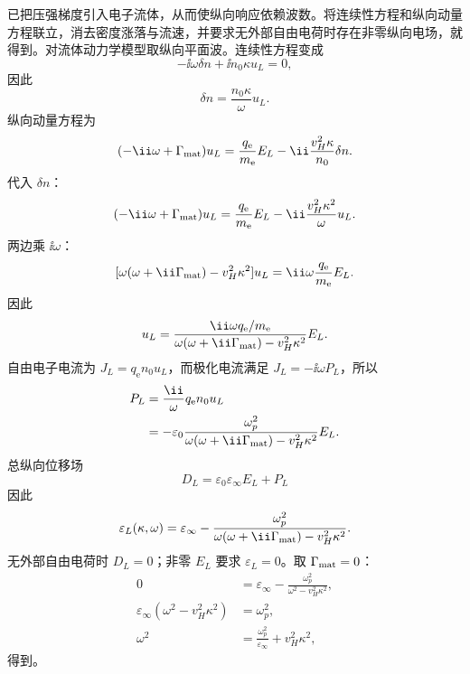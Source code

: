 \begin{exbox}
\medskip

 已把压强梯度引入电子流体，从而使纵向响应依赖波数。将连续性方程和纵向动量方程联立，消去密度涨落与流速，并要求无外部自由电荷时存在非零纵向电场，就得到。对流体动力学模型取纵向平面波。连续性方程变成
\[
-\ii\omega\delta n
+\ii n_0\kappa u_L=0,
\]
因此
\[
\delta n=\frac{n_0\kappa}{\omega}u_L.
\]
纵向动量方程为
\[
(-\ii\omega+\Gamma_{\rm mat})u_L
=\frac{q_{\mathrm e}}{m_{\mathrm e}}E_L
-\ii\frac{v_H^2\kappa}{n_0}\delta n.
\]
代入 $\delta n$：
\[
(-\ii\omega+\Gamma_{\rm mat})u_L
=\frac{q_{\mathrm e}}{m_{\mathrm e}}E_L
-\ii\frac{v_H^2\kappa^2}{\omega}u_L.
\]
两边乘 $\ii\omega$：
\[
[\omega(\omega+\ii\Gamma_{\rm mat})-v_H^2\kappa^2]u_L
=\ii\omega\frac{q_{\mathrm e}}{m_{\mathrm e}}E_L.
\]
因此
\[
u_L
=\frac{\ii\omega q_{\mathrm e}/m_{\mathrm e}}
{\omega(\omega+\ii\Gamma_{\rm mat})-v_H^2\kappa^2}E_L.
\]
自由电子电流为 $J_L=q_{\mathrm e} n_0u_L$，而极化电流满足 $J_L=-\ii\omega P_L$，所以
\begin{align*}
P_L
&=\frac{\ii}{\omega}q_{\mathrm e} n_0u_L\\
&=-\varepsilon_0
\frac{\omega_p^2}
{\omega(\omega+\ii\Gamma_{\rm mat})-v_H^2\kappa^2}E_L.
\end{align*}
总纵向位移场
\[
D_L=\varepsilon_0\varepsilon_\infty E_L+P_L
\]
因此
\[
\varepsilon_L(\kappa,\omega)
=\varepsilon_\infty-
\frac{\omega_p^2}
{\omega(\omega+\ii\Gamma_{\rm mat})-v_H^2\kappa^2}.
\]
无外部自由电荷时 $D_L=0$；非零 $E_L$ 要求 $\varepsilon_L=0$。取 $\Gamma_{\rm mat}=0$：
\begin{align*}
0
&=\varepsilon_\infty-
\frac{\omega_p^2}{\omega^2-v_H^2\kappa^2},\\
\varepsilon_\infty(\omega^2-v_H^2\kappa^2)
&=\omega_p^2,\\
\omega^2
&=\frac{\omega_p^2}{\varepsilon_\infty}+v_H^2\kappa^2,
\end{align*}
得到。
\end{exbox}

